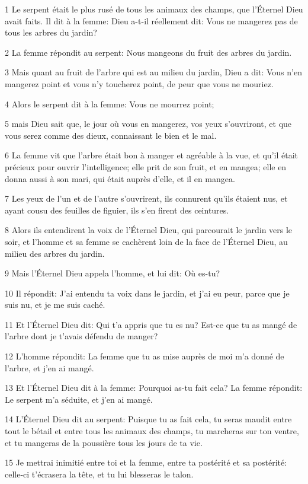 \par 1 Le serpent était le plus rusé de tous les animaux des champs, que l'Éternel Dieu avait faits. Il dit à la femme: Dieu a-t-il réellement dit: Vous ne mangerez pas de tous les arbres du jardin?
\par 2 La femme répondit au serpent: Nous mangeons du fruit des arbres du jardin.
\par 3 Mais quant au fruit de l'arbre qui est au milieu du jardin, Dieu a dit: Vous n'en mangerez point et vous n'y toucherez point, de peur que vous ne mouriez.
\par 4 Alors le serpent dit à la femme: Vous ne mourrez point;
\par 5 mais Dieu sait que, le jour où vous en mangerez, vos yeux s'ouvriront, et que vous serez comme des dieux, connaissant le bien et le mal.
\par 6 La femme vit que l'arbre était bon à manger et agréable à la vue, et qu'il était précieux pour ouvrir l'intelligence; elle prit de son fruit, et en mangea; elle en donna aussi à son mari, qui était auprès d'elle, et il en mangea.
\par 7 Les yeux de l'un et de l'autre s'ouvrirent, ils connurent qu'ils étaient nus, et ayant cousu des feuilles de figuier, ils s'en firent des ceintures.
\par 8 Alors ils entendirent la voix de l'Éternel Dieu, qui parcourait le jardin vers le soir, et l'homme et sa femme se cachèrent loin de la face de l'Éternel Dieu, au milieu des arbres du jardin.
\par 9 Mais l'Éternel Dieu appela l'homme, et lui dit: Où es-tu?
\par 10 Il répondit: J'ai entendu ta voix dans le jardin, et j'ai eu peur, parce que je suis nu, et je me suis caché.
\par 11 Et l'Éternel Dieu dit: Qui t'a appris que tu es nu? Est-ce que tu as mangé de l'arbre dont je t'avais défendu de manger?
\par 12 L'homme répondit: La femme que tu as mise auprès de moi m'a donné de l'arbre, et j'en ai mangé.
\par 13 Et l'Éternel Dieu dit à la femme: Pourquoi as-tu fait cela? La femme répondit: Le serpent m'a séduite, et j'en ai mangé.
\par 14 L'Éternel Dieu dit au serpent: Puisque tu as fait cela, tu seras maudit entre tout le bétail et entre tous les animaux des champs, tu marcheras sur ton ventre, et tu mangeras de la poussière tous les jours de ta vie.
\par 15 Je mettrai inimitié entre toi et la femme, entre ta postérité et sa postérité: celle-ci t'écrasera la tête, et tu lui blesseras le talon.
